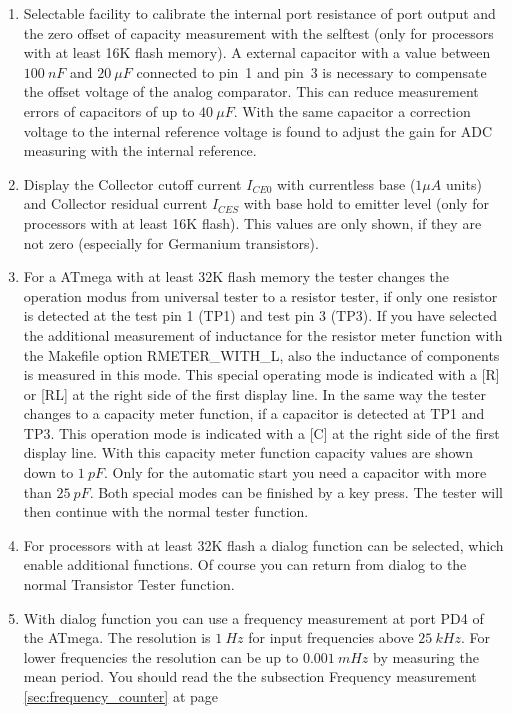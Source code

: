 \begin{enumerate}
\item Selectable facility to calibrate the internal port resistance of port output and
the zero offset of capacity measurement with the selftest (only for processors with at least 16K flash memory).
A external capacitor with a value between \(100~nF\) 
and \(20~\mu F\) connected to pin~1 and pin~3 is necessary to compensate the offset voltage of the analog comparator.
This can reduce measurement errors of capacitors of up to \(40~\mu F\).
With the same capacitor a correction voltage to the internal reference voltage is found to adjust the
gain for ADC measuring with the internal reference.
\item Display the Collector cutoff current \(I_{CE0}\) with currentless base (\(1\mu A\) units) and
Collector residual current \(I_{CES}\) with base hold to emitter level (only for processors with at least 16K flash).
This values are only shown, if they are not zero (especially for Germanium transistors).
\item For a ATmega with at least 32K flash memory the tester changes the operation modus from universal tester
to a resistor tester, if only one resistor is detected at the test pin 1 (TP1) and test pin 3 (TP3).
If you have selected the additional measurement of inductance for the resistor meter function with the 
Makefile option RMETER\_WITH\_L, also the inductance of components is measured in this mode.
This special operating mode is indicated with a [R] or [RL] at the right side of the first display line.
In the same way the tester changes to a capacity meter function, if a capacitor is detected at TP1 and TP3.
This operation mode is indicated with a [C] at the right side of the first display line.
With this capacity meter function capacity values are shown down to \(1~pF\). Only for the automatic
start you need a capacitor with more than \(25~pF\).
Both special modes can be finished by a key press. 
The tester will then continue with the normal tester function.
\item For processors with at least 32K flash a dialog function can be selected, which enable additional functions.
Of course you can return from dialog to the normal Transistor Tester function.
\item With dialog function you can use a frequency measurement at port PD4 of the ATmega.
The resolution is \(1~Hz\) for input frequencies above \(25~kHz\).
For lower frequencies the resolution can be up to \(0.001~mHz\) by measuring the mean period.
You should read the the subsection Frequency measurement \ref{sec:frequency_counter} at page \pageref{sec:frequency_counter} 

\end{enumerate}
